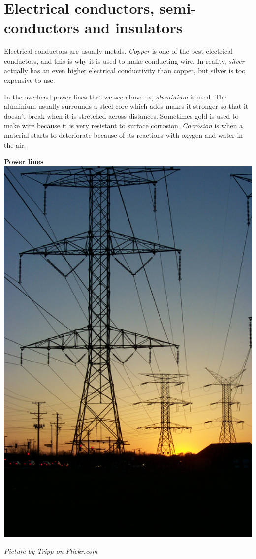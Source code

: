             \section{Electrical conductors, semi-conductors and insulators}
            \nopagebreak
\label{m38706*id66058}
 Electrical conductors are usually metals. \textsl{Copper} is one of the best electrical conductors, and this is why it is used to make conducting wire. In reality, \textsl{silver} actually has an even higher electrical conductivity than copper, but silver is too expensive to use.  \\
\begin{minipage}{0.5\textwidth}
 In the overhead power lines that we see above us, \textsl{aluminium} is used. The aluminium usually surrounds a steel core which adds makes it stronger so that it doesn't break when it is stretched across distances. Sometimes gold is used to make wire because it is very resistant to surface corrosion. \textsl{Corrosion} is when a material starts to deteriorate because of its reactions with oxygen and water in the air.\par 
\end{minipage}
\begin{minipage}{.5\textwidth}
\begin{center}
\textbf{Power lines}\\
 \includegraphics[height=.4\textwidth]{photos/Tripp.jpg}\par
\textit{Picture by Tripp on Flickr.com}
\end{center}
\end{minipage}
